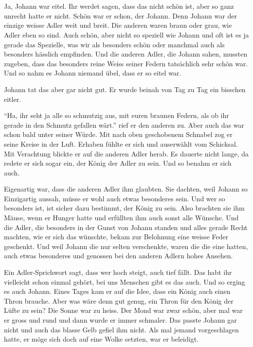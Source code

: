 \chapter*{}
\lettrine[lines=3]{\color{red}J}{}a, Johann war eitel. Ihr werdet sagen, dass das nicht schön ist, aber so ganz unrecht hatte er nicht. Schön war er schon, der Johann. Denn Johann war der einzige weisse Adler weit und breit. Die anderen waren braun oder grau, wie Adler eben so sind. Auch schön, aber nicht so speziell wie Johann und oft ist es ja gerade das Spezielle, was wir als besonders schön oder manchmal auch als besonders hässlich empfinden. Und die anderen Adler, die Johann sahen, mussten zugeben, dass das besonders reine Weiss seiner Federn tatsächlich sehr schön war. Und so nahm es Johann niemand übel, dass er so eitel war. 

Johann tat das aber gar nicht gut. Er wurde beinah von Tag zu Tag ein bisschen eitler. 

\enquote{Ha, ihr seht ja alle so schmutzig aus, mit euren braunen Federn, als ob ihr gerade in den Schmutz gefallen wärt.} rief er den anderen zu. Aber auch das war schon bald unter seiner Würde. Mit nach oben geschobenem Schnabel zog er seine Kreise in der Luft. Erhaben fühlte er sich und auserwählt vom Schicksal. Mit Verachtung blickte er auf die anderen Adler herab. Es dauerte nicht lange, da redete er sich sogar ein, der König der Adler zu sein. Und so benahm er sich auch.

Eigenartig war, dass die anderen Adler ihm glaubten. Sie dachten, weil Johann so Einzigartig aussah, müsse er wohl auch etwas besonderes sein. Und wer so besonders ist, ist sicher dazu bestimmt, der König zu sein. Also brachten sie ihm Mäuse, wenn er Hunger hatte und erfüllten ihm auch sonst alle Wünsche. Und die Adler, die besonders in der Gunst von Johann standen und alles gerade Recht machten, wie er sich das wünschte, bekam zur Belohnung eine weisse Feder geschenkt. Und weil Johann die nur selten verschenkte, waren die die eine hatten, auch etwas besonderes und genossen bei den anderen Adlern hohes Ansehen.

Ein Adler-Sprichwort sagt, dass wer hoch steigt, auch tief fällt. Das habt ihr vielleicht schon einmal gehört, bei uns Menschen gibt es das auch. Und so erging es auch Johann. Eines Tages kam er auf die Idee, dass ein König auch einen Thron brauche. Aber was wäre denn gut genug, ein Thron für den König der Lüfte zu sein? Die Sonne war zu heiss. Der Mond war zwar schön, aber mal war er gross und rund und dann wurde er immer schmaler. Das passte Johann gar nicht und auch das blasse Gelb gefiel ihm nicht. Als mal jemand vorgeschlagen hatte, er möge sich doch auf eine Wolke setzten, war er beleidigt.

